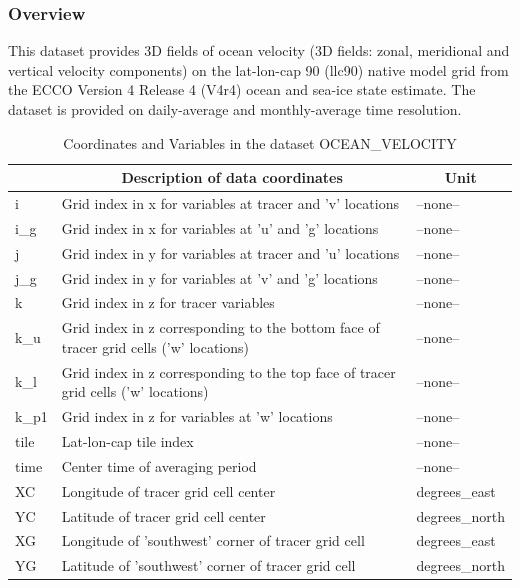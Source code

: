 \subsubsection{Overview}
This dataset provides 3D fields of ocean velocity (3D fields: zonal, meridional and vertical velocity components) on the lat-lon-cap 90 (llc90) native model grid from the ECCO Version 4 Release 4 (V4r4) ocean and sea-ice state estimate. The dataset is provided on daily-average and monthly-average time resolution. 
\begin{longtable}{|m{}|m{}|m{}|}
\caption{Coordinates and Variables in the dataset OCEAN\_VELOCITY}
\label{tab:table-OCEAN_VELOCITY-fields} \\ 
\hline \endhead \hline \endfoot
\rowcolor{lightgray} \multicolumn{1}{|c|}{\textbf{Coordinates}} & \multicolumn{1}{|c|}{\textbf{Description of data coordinates}} &  \multicolumn{1}{|c|}{\textbf{Unit}}\\ \hline
i &Grid index in x for variables at tracer and 'v' locations &--none--  \\ \hline
i\_g &Grid index in x for variables at 'u' and 'g' locations &--none--  \\ \hline
j &Grid index in y for variables at tracer and 'u' locations &--none--  \\ \hline
j\_g &Grid index in y for variables at 'v' and 'g' locations &--none--  \\ \hline
k &Grid index in z for tracer variables &--none--  \\ \hline
k\_u &Grid index in z corresponding to the bottom face of tracer grid cells ('w' locations) &--none--  \\ \hline
k\_l &Grid index in z corresponding to the top face of tracer grid cells ('w' locations) &--none--  \\ \hline
k\_p1 &Grid index in z for variables at 'w' locations &--none--  \\ \hline
tile &Lat-lon-cap tile index &--none--  \\ \hline
time &Center time of averaging period &--none--  \\ \hline
XC &Longitude of tracer grid cell center &degrees\_east  \\ \hline
YC &Latitude of tracer grid cell center &degrees\_north  \\ \hline
XG &Longitude of 'southwest' corner of tracer grid cell &degrees\_east  \\ \hline
YG &Latitude of 'southwest' corner of tracer grid cell &degrees\_north  \\ \hline

\end{longtable}
